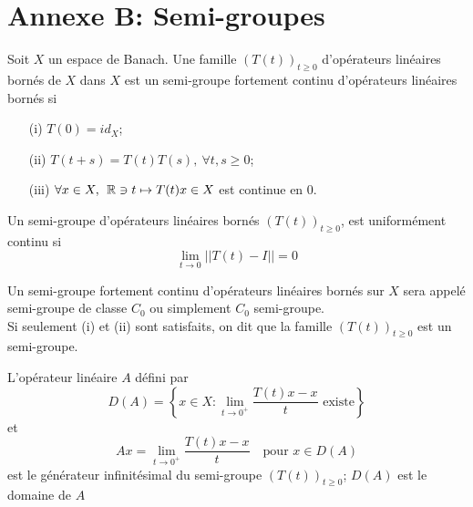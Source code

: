 \chapter*{Annexe B: Semi-groupes}
\begin{definition}
	Soit $X$ un espace de Banach. Une famille $(T(t))_{t \geq 0}$ d'opérateurs linéaires bornés de $X$ dans $X$ est un semi-groupe fortement continu d'opérateurs linéaires bornés si
	\begin{enumerate}
		\item[(i)] $T(0)=id_X$;
		\item[(ii)] $T(t+s)=T(t)T(s), \: \forall t, s \geq 0$;
		\item[(iii)] $\forall x \in X, \:\: \mathbb R \ni t \mapsto T(t)x \in X$ est continue en $0$.  
	\end{enumerate}
\end{definition}
\begin{remark}
	Un semi-groupe d'opérateurs linéaires bornés $(T(t))_{t\geq 0}$, est uniformément continu si
	$$
	\lim_{t \rightarrow 0} ||T(t)-I||=0
	$$
\end{remark}
Un semi-groupe fortement continu d'opérateurs linéaires bornés sur $X$ sera appelé semi-groupe de classe $C_0$ ou simplement $C_0$ semi-groupe.\\

Si seulement (i) et (ii) sont satisfaits, on dit que la famille $(T(t))_{t\geq 0}$ est un semi-groupe.
\begin{definition}
	L'opérateur linéaire $A$ défini par
	\begin{equation}
	D(A)= \left \{ x \in X : \lim_{t \rightarrow 0^+} \dfrac{T(t)x-x}{t} \mbox{ existe} \right \}
	\end{equation}
	et
	\begin{equation}
	Ax=\lim_{t \rightarrow 0^+} \dfrac{T(t)x-x}{t} \quad \mbox{pour } x \in D(A)
	\end{equation}
	est le générateur infinitésimal du semi-groupe $(T(t))_{t\geq 0}$; $D(A)$ est le domaine de $A$
\end{definition}
